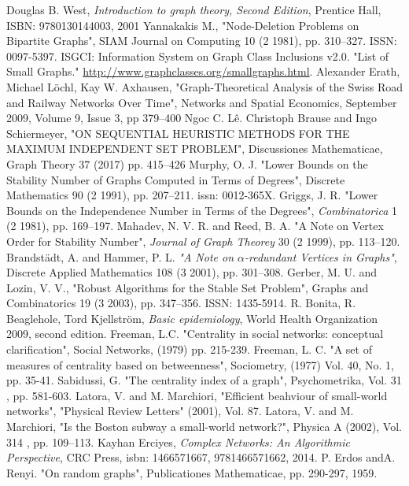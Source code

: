 \documentclass[14pt, oneside, a4paper, openany]{scrartcl}
\begin{document}
\printindex
\newpage
\begin{thebibliography}{9}
	Douglas B. West,
	\textit{Introduction to graph theory, Second Edition},
	Prentice Hall, ISBN: 9780130144003, 2001
	Yannakakis M.,
	"Node-Deletion Problems on Bipartite Graphs",
	SIAM Journal on Computing 10 (2 1981), pp. 310–327. ISSN: 0097-5397.
	ISGCI: Information System on Graph Class Inclusions v2.0. "List of Small Graphs." \href{http://www.graphclasses.org/smallgraphs.html}{http://www.graphclasses.org/smallgraphs.html}.
	Alexander Erath, Michael Löchl, Kay W. Axhausen,
	"Graph-Theoretical Analysis of the Swiss Road and Railway Networks Over Time", 
	Networks and Spatial Economics,
	September 2009, Volume 9, Issue 3, pp 379–400
	Ngoc C. Lê. Christoph Brause and Ingo Schiermeyer,
	"ON SEQUENTIAL HEURISTIC METHODS FOR THE MAXIMUM INDEPENDENT SET PROBLEM",
	Discussiones Mathematicae, Graph Theory 37 (2017) pp. 415–426
	Murphy, O. J.
	"Lower Bounds on the Stability Number of Graphs Computed in Terms of Degrees", Discrete Mathematics 90 (2 1991), pp. 207–211. issn: 0012-365X. 
	Griggs, J. R.
	"Lower Bounds on the Independence Number in Terms of the Degrees",
	\textit{Combinatorica} 1 (2 1981), pp. 169–197.
	Mahadev, N. V. R. and Reed, B. A.
	"A Note on Vertex Order for Stability Number",
	\textit{Journal of Graph Theorey} 30 (2 1999), pp. 113–120.
	Brandstädt, A. and Hammer, P. L.
	\textit{"A Note on $\alpha$-redundant Vertices in Graphs"},
	Discrete Applied Mathematics 108 (3 2001), pp. 301–308.
	Gerber, M. U. and Lozin, V. V.,
	"Robust Algorithms for the Stable Set Problem",
	Graphs and Combinatorics 19 (3 2003), pp. 347–356. ISSN: 1435-5914.
	R. Bonita, R. Beaglehole, Tord Kjellström,
	\textit{Basic epidemiology},
	World Health Organization 2009, second edition.
	Freeman, L.C.
	"Centrality in social networks: conceptual clarification",
	Social Networks, (1979) pp. 215-239.
	Freeman, L. C.
	"A set of measures of centrality based on betweenness",
	Sociometry, (1977) Vol. 40, No. 1, pp. 35-41.
	Sabidussi, G. 
	"The centrality index of a graph",
	 Psychometrika, Vol. 31 , pp. 581-603.
	 Latora, V. and M. Marchiori,
	 "Efficient beahviour of small-world networks",
	 "Physical Review Letters" (2001), Vol. 87.
	 Latora, V. and M. Marchiori, 
	 "Is the Boston subway a small-world network?",
	 Physica A (2002), Vol. 314 , pp. 109–113.
	 Kayhan Erciyes,
	 \textit{Complex Networks: An Algorithmic Perspective},
	 CRC Press, isbn: 1466571667, 9781466571662, 2014.
	 P. Erdos andA. Renyi.
	 "On random graphs",
	 Publicationes Mathematicae, pp. 290-297, 1959.
\end{thebibliography}
\end{document}
